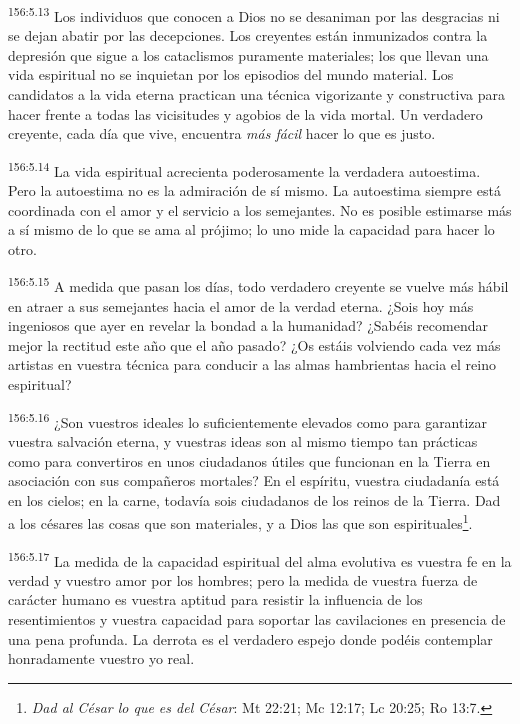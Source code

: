 \par
\textsuperscript{156:5.13} Los individuos que conocen a Dios no se desaniman por las desgracias ni se dejan abatir por las decepciones. Los creyentes están inmunizados contra la depresión que sigue a los cataclismos puramente materiales; los que llevan una vida espiritual no se inquietan por los episodios del mundo material. Los candidatos a la vida eterna practican una técnica vigorizante y constructiva para hacer frente a todas las vicisitudes y agobios de la vida mortal. Un verdadero creyente, cada día que vive, encuentra \textit{más fácil} hacer lo que es justo.

\par
\textsuperscript{156:5.14} La vida espiritual acrecienta poderosamente la verdadera autoestima. Pero la autoestima no es la admiración de sí mismo. La autoestima siempre está coordinada con el amor y el servicio a los semejantes. No es posible estimarse más a sí mismo de lo que se ama al prójimo; lo uno mide la capacidad para hacer lo otro.

\par
\textsuperscript{156:5.15} A medida que pasan los días, todo verdadero creyente se vuelve más hábil en atraer a sus semejantes hacia el amor de la verdad eterna. ¿Sois hoy más ingeniosos que ayer en revelar la bondad a la humanidad? ¿Sabéis recomendar mejor la rectitud este año que el año pasado? ¿Os estáis volviendo cada vez más artistas en vuestra técnica para conducir a las almas hambrientas hacia el reino espiritual?

\par
\textsuperscript{156:5.16} ¿Son vuestros ideales lo suficientemente elevados como para garantizar vuestra salvación eterna, y vuestras ideas son al mismo tiempo tan prácticas como para convertiros en unos ciudadanos útiles que funcionan en la Tierra en asociación con sus compañeros mortales? En el espíritu, vuestra ciudadanía está en los cielos; en la carne, todavía sois ciudadanos de los reinos de la Tierra. Dad a los césares las cosas que son materiales, y a Dios las que son espirituales\footnote{\textit{Dad al César lo que es del César}: Mt 22:21; Mc 12:17; Lc 20:25; Ro 13:7.}.

\par
\textsuperscript{156:5.17} La medida de la capacidad espiritual del alma evolutiva es vuestra fe en la verdad y vuestro amor por los hombres; pero la medida de vuestra fuerza de carácter humano es vuestra aptitud para resistir la influencia de los resentimientos y vuestra capacidad para soportar las cavilaciones en presencia de una pena profunda. La derrota es el verdadero espejo donde podéis contemplar honradamente vuestro yo real.

